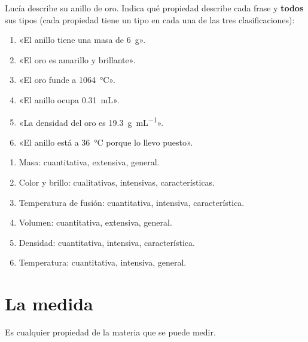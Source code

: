 \begin{exercise}
    Lucía describe su anillo de oro. Indica qué propiedad describe cada frase y \textbf{todos} sus tipos (cada propiedad tiene un tipo en cada una de las tres clasificaciones):
    \begin{enumerate}[label=\letraminuscula]
        \item «El anillo tiene una masa de \qty{6}{\g}».
        \item «El oro es amarillo y brillante».
        \item «El oro funde a \qty{1064}{\celsius}».
        \item «El anillo ocupa \qty{0.31}{\mL}».
        \item «La densidad del oro es \qty{19.3}{\g\per\mL}».
        \item «El anillo está a \qty{36}{\celsius} porque lo llevo puesto».
    \end{enumerate}
    \begin{solu}
        \begin{enumerate}[label=\alph*)]
            \item Masa: cuantitativa, extensiva, general.
            \item Color y brillo: cualitativas, intensivas, características.
            \item Temperatura de fusión: cuantitativa, intensiva, característica.
            \item Volumen: cuantitativa, extensiva, general.
            \item Densidad: cuantitativa, intensiva, característica.
            \item Temperatura: cuantitativa, intensiva, general.
        \end{enumerate}
    \end{solu}
\end{exercise}




\section{La medida}

\providecommand{\cancelunit}[1]{\cancelred{\unit{#1}}}

\begin{definition}[Magnitud]
    Es cualquier propiedad de la materia que se puede medir.
\end{definition}

